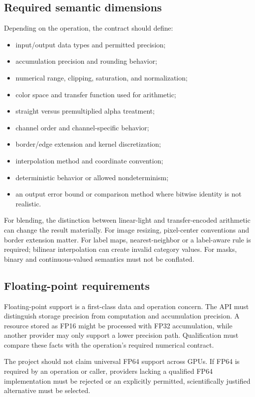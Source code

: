 \documentclass[11pt,a4paper,oneside]{article}
\begin{document}
\subsection{Required semantic dimensions}

Depending on the operation, the contract should define:
\begin{itemize}
  \item input/output data types and permitted precision;
  \item accumulation precision and rounding behavior;
  \item numerical range, clipping, saturation, and normalization;
  \item color space and transfer function used for arithmetic;
  \item straight versus premultiplied alpha treatment;
  \item channel order and channel-specific behavior;
  \item border/edge extension and kernel discretization;
  \item interpolation method and coordinate convention;
  \item deterministic behavior or allowed nondeterminism;
  \item an output error bound or comparison method where bitwise identity is not realistic.
\end{itemize}

For blending, the distinction between linear-light and transfer-encoded arithmetic can change the result materially. For image resizing, pixel-center conventions and border extension matter. For label maps, nearest-neighbor or a label-aware rule is required; bilinear interpolation can create invalid category values. For masks, binary and continuous-valued semantics must not be conflated.

\subsection{Floating-point requirements}

Floating-point support is a first-class data and operation concern. The API must distinguish storage precision from computation and accumulation precision. A resource stored as FP16 might be processed with FP32 accumulation, while another provider may only support a lower precision path. Qualification must compare these facts with the operation's required numerical contract.

The project should not claim universal FP64 support across GPUs. If FP64 is required by an operation or caller, providers lacking a qualified FP64 implementation must be rejected or an explicitly permitted, scientifically justified alternative must be selected.
\end{document}
